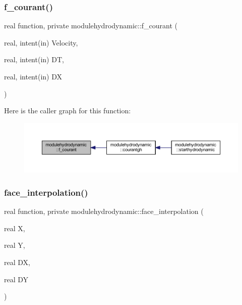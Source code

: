 \subsubsection{\texorpdfstring{f\+\_\+courant()}{f\_courant()}}
{\footnotesize\ttfamily real function, private modulehydrodynamic\+::f\+\_\+courant (\begin{DoxyParamCaption}\item[{real, intent(in)}]{Velocity,  }\item[{real, intent(in)}]{DT,  }\item[{real, intent(in)}]{DX }\end{DoxyParamCaption})\hspace{0.3cm}{\ttfamily [private]}}

Here is the caller graph for this function\+:\nopagebreak
\begin{figure}[H]
\begin{center}
\leavevmode
\includegraphics[width=350pt]{namespacemodulehydrodynamic_a752353d6a88048109cbe1a037fe56ef7_icgraph}
\end{center}
\end{figure}
\mbox{\label{namespacemodulehydrodynamic_aeaeab24d9e7539d66950b61105ead64f}} 
\subsubsection{\texorpdfstring{face\+\_\+interpolation()}{face\_interpolation()}}
{\footnotesize\ttfamily real function, private modulehydrodynamic\+::face\+\_\+interpolation (\begin{DoxyParamCaption}\item[{real}]{X,  }\item[{real}]{Y,  }\item[{real}]{DX,  }\item[{real}]{DY }\end{DoxyParamCaption})\hspace{0.3cm}{\ttfamily [private]}}


